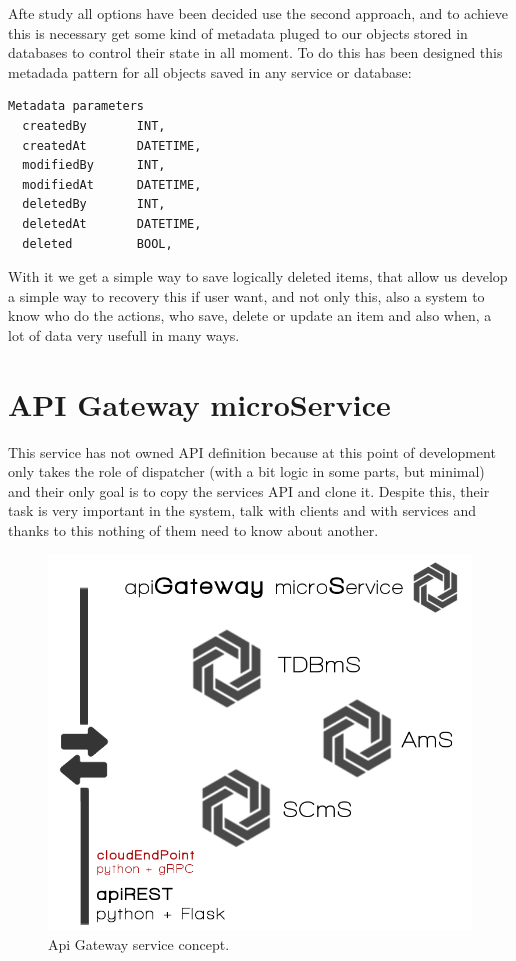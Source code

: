 \noindent Afte study all options have been decided use the second approach, and to achieve
this is necessary get some kind of metadata pluged to our objects stored in databases
to control their state in all moment.
To do this has been designed this metadada pattern for all objects saved in any
service or database:

\begin{lstlisting}[language=python,frame=none]
  Metadata parameters
  createdBy       INT,
  createdAt       DATETIME,
  modifiedBy      INT,
  modifiedAt      DATETIME,
  deletedBy       INT,
  deletedAt       DATETIME,
  deleted         BOOL,

\end{lstlisting}

With it we get a simple way to save logically deleted items, that allow us
develop a simple way to recovery this if user want, and not only this, also
a system to know who do the actions, who save, delete or update an item and
also when, a lot of data very usefull in many ways.


\section{API Gateway microService}

This service has not owned API definition because at this point of development
only takes the role of dispatcher (with a bit logic in some parts, but minimal)
and their only goal is to copy the services API and clone it. Despite this, their
task is very important in the system, talk with clients and with services and thanks
to this nothing of them need to know about another.

\begin{figure}[H]
  \includegraphics[scale=0.35]{img/graphics/apigateway.png}
  \centering
  \caption{Api Gateway service concept.}
\end{figure}


